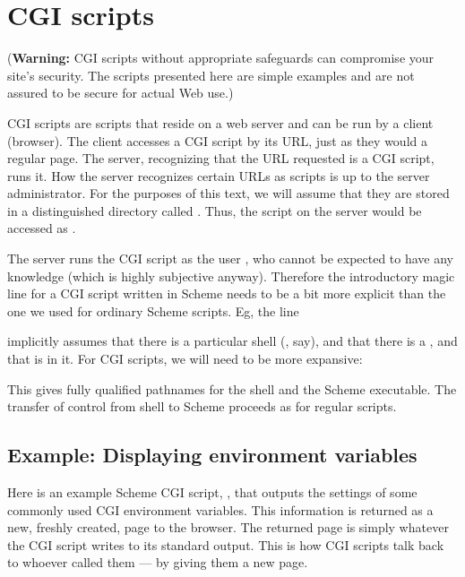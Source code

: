 \chapter{CGI scripts}

{\color[rgb]{1 0 0}({\bf Warning:} CGI scripts without
appropriate safeguards can compromise your site's
security.  The scripts presented here are simple
examples and are not assured to be secure for actual
Web use.)}

\medskip

CGI scripts \cite{cgi} are scripts that reside on a
web server and can be run by a client (browser).  The
client accesses a CGI script by its URL, just as they
would a regular page.  The server, recognizing that the
URL requested is a CGI script, runs it.  How the server
recognizes certain URLs as scripts is up to the server
administrator.  For the purposes of this text, we will
assume that they are stored in a distinguished
directory called .  Thus, the script
 on the server  would
be accessed as .

The server runs the CGI script as the user ,
who cannot be expected to have any
 knowledge (which is highly subjective
anyway).  Therefore the introductory magic line for a
CGI script written in Scheme needs to be a bit more
explicit than the one we used for ordinary Scheme
scripts.  Eg, the line


\n implicitly assumes that there is a particular shell
(, say), and that there is a , and that
 is in it.  For CGI scripts, we will need
to be more expansive:


This gives fully qualified pathnames for the shell and
the Scheme executable.  The transfer of control from
shell to Scheme proceeds as for regular scripts.

\section{Example: Displaying environment variables}

Here is an example Scheme CGI script,
, that outputs the settings of some
commonly used CGI environment variables.  This
information is returned as a new, freshly created, page
to the browser.  The returned page is simply whatever
the CGI script writes to its standard output.  This is
how CGI scripts talk back to whoever called them --- by
giving them a new page.

